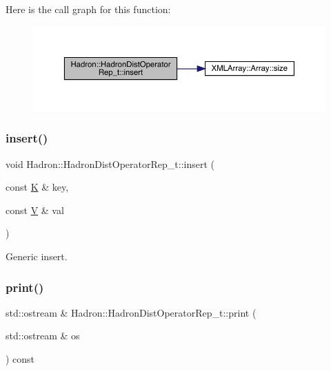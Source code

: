 Here is the call graph for this function\+:
\nopagebreak
\begin{figure}[H]
\begin{center}
\leavevmode
\includegraphics[width=350pt]{dd/de0/classHadron_1_1HadronDistOperatorRep__t_a05856fbd2f2205ddc461685d987713b9_cgraph}
\end{center}
\end{figure}
\mbox{\label{classHadron_1_1HadronDistOperatorRep__t_a05856fbd2f2205ddc461685d987713b9}} 
\subsubsection{\texorpdfstring{insert()}{insert()}\hspace{0.1cm}{\footnotesize\ttfamily [2/2]}}
{\footnotesize\ttfamily void Hadron\+::\+Hadron\+Dist\+Operator\+Rep\+\_\+t\+::insert (\begin{DoxyParamCaption}\item[{const \mbox{\hyperlink{classHadron_1_1HadronDistOperatorRep__t_a670c7409bfd80616aeb0159590bcdb6b}{K}} \&}]{key,  }\item[{const \mbox{\hyperlink{classHadron_1_1HadronDistOperatorRep__t_a40f37383ae57b1d0bbf944d698a10382}{V}} \&}]{val }\end{DoxyParamCaption})}



Generic insert. 

\mbox{\label{classHadron_1_1HadronDistOperatorRep__t_a800e1844116007d2ca372628f2388ee5}} 
\subsubsection{\texorpdfstring{print()}{print()}\hspace{0.1cm}{\footnotesize\ttfamily [1/2]}}
{\footnotesize\ttfamily std\+::ostream \& Hadron\+::\+Hadron\+Dist\+Operator\+Rep\+\_\+t\+::print (\begin{DoxyParamCaption}\item[{std\+::ostream \&}]{os }\end{DoxyParamCaption}) const}



